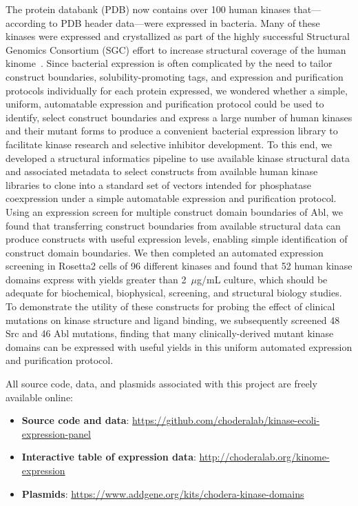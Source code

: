 \documentclass[9pt,lineno]{elife}
\begin{document}
The protein databank (PDB) now contains over 100 human kinases that---according to PDB header data---were expressed in bacteria.
Many of these kinases were expressed and crystallized as part of the highly successful Structural Genomics Consortium (SGC) effort to increase structural coverage of the human kinome~\citep{sgc-kinome}.
Since bacterial expression is often complicated by the need to tailor construct boundaries, solubility-promoting tags, and expression and purification protocols individually for each protein expressed, we wondered whether a simple, uniform, automatable expression and purification protocol could be used to identify, select construct boundaries and express a large number of human kinases and their mutant forms to produce a convenient bacterial expression library to facilitate kinase research and selective inhibitor development. 
To this end, we developed a structural informatics pipeline to use available kinase structural data and associated metadata to select constructs from available human kinase libraries to clone into a standard set of vectors intended for phosphatase coexpression under a simple automatable expression and purification protocol. 
Using an expression screen for multiple construct domain boundaries of Abl, we found that transferring construct boundaries from available structural data can produce constructs with useful expression levels, enabling simple identification of construct domain boundaries.  
We then completed an automated expression screening in Rosetta2 cells of 96 different kinases and found that 52 human kinase domains express with yields greater than 2~$\mu$g/mL culture, which should be adequate for biochemical, biophysical, screening, and structural biology studies. 
To demonstrate the utility of these constructs for probing the effect of clinical mutations on kinase structure and ligand binding, we subsequently screened 48 Src and 46 Abl mutations, finding that many clinically-derived mutant kinase domains can be expressed with useful yields in this uniform automated expression and purification protocol.

All source code, data, and plasmids associated with this project are freely available online:

\begin{itemize}
\item {\bf Source code and data}: \url{https://github.com/choderalab/kinase-ecoli-expression-panel}
\item {\bf Interactive table of expression data}: \url{http://choderalab.org/kinome-expression}
\item {\bf Plasmids}: \url{https://www.addgene.org/kits/chodera-kinase-domains}
\end{itemize}
\end{document}
